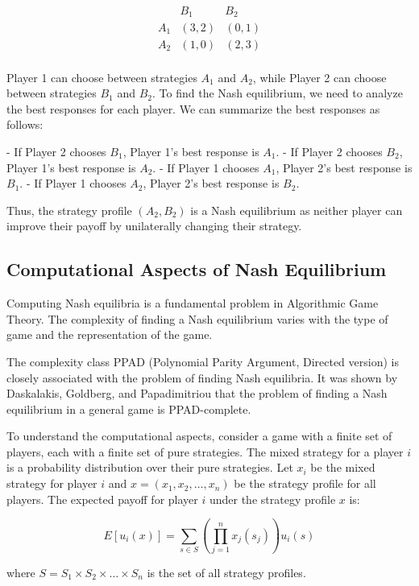 \documentclass[12pt]{book} %
\begin{document}
\[
\begin{array}{c|cc}
 & B_1 & B_2 \\
\hline
A_1 & (3, 2) & (0, 1) \\
A_2 & (1, 0) & (2, 3) \\
\end{array}
\]

Player 1 can choose between strategies $A_1$ and $A_2$, while Player 2 can choose between strategies $B_1$ and $B_2$. To find the Nash equilibrium, we need to analyze the best responses for each player. We can summarize the best responses as follows:

- If Player 2 chooses $B_1$, Player 1's best response is $A_1$.
- If Player 2 chooses $B_2$, Player 1's best response is $A_2$.
- If Player 1 chooses $A_1$, Player 2's best response is $B_1$.
- If Player 1 chooses $A_2$, Player 2's best response is $B_2$.

Thus, the strategy profile $(A_2, B_2)$ is a Nash equilibrium as neither player can improve their payoff by unilaterally changing their strategy.

\subsection{Computational Aspects of Nash Equilibrium}
Computing Nash equilibria is a fundamental problem in Algorithmic Game Theory. The complexity of finding a Nash equilibrium varies with the type of game and the representation of the game.

The complexity class PPAD (Polynomial Parity Argument, Directed version) is closely associated with the problem of finding Nash equilibria. It was shown by Daskalakis, Goldberg, and Papadimitriou that the problem of finding a Nash equilibrium in a general game is PPAD-complete.

To understand the computational aspects, consider a game with a finite set of players, each with a finite set of pure strategies. The mixed strategy for a player $i$ is a probability distribution over their pure strategies. Let $x_i$ be the mixed strategy for player $i$ and $x = (x_1, x_2, \ldots, x_n)$ be the strategy profile for all players. The expected payoff for player $i$ under the strategy profile $x$ is:

\[
E[u_i(x)] = \sum_{s \in S} \left( \prod_{j=1}^{n} x_j(s_j) \right) u_i(s)
\]

where $S = S_1 \times S_2 \times \ldots \times S_n$ is the set of all strategy profiles.
\end{document}
